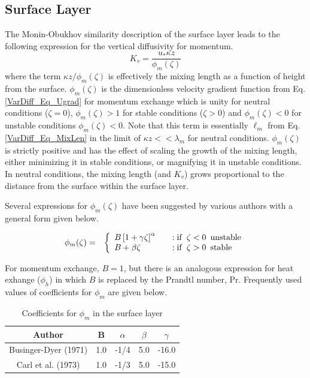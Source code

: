 \subsection{Surface Layer}

The Monin-Obukhov similarity description of the surface layer leads to the following
expression for the vertical diffusivity for momentum.
\begin{equation}\label{VarDiff_Eq_Kz_Surf}
K_v = \frac{u_{*} \kappa z}{\phi_m(\zeta)}
\end{equation}
where the term $\kappa z / \phi_m(\zeta)$ is effectively the mixing length as a function of height from the
surface.
$\phi_m(\zeta)$ is the dimensionless velocity gradient 
function from Eq. \ref{VarDiff_Eq_Ugrad} for momentum exchange which is unity for neutral conditions ($\zeta=0$),
$\phi_m(\zeta)>1$ for stable conditions ($\zeta>0$) and $\phi_m(\zeta)<0$ for unstable
conditions $\phi_m(\zeta)<0$.
Note that this term is essentially $\ell_m$ from Eq. \ref{VarDiff_Eq_MixLen} in the limit of
$\kappa z << \lambda_m$ for neutral conditions. $\phi_m(\zeta)$ is strictly positive and
has the effect of scaling the growth of the mixing length, either minimizing it in
stable conditions, or magnifying it in unstable conditions. In neutral conditions, the
mixing length (and $K_v$) grows proportional to the distance from the surface within the
surface layer. 

Several expressions for $\phi_m(\zeta)$ have been suggested by various authors with a
general form given below.

\begin{eqnarray}\label{VarDiff_Eq_PhiB}
\phi_m(\zeta) &=& \left\{ \begin{array} {l@{\quad \quad}l}
B \left[ 1+\gamma \zeta\right]^{\alpha}  &:  \mathrm{if}\,\,\, \zeta < 0 \,\,\, \mathrm{unstable} \\
B  + \beta \zeta                         &:  \mathrm{if}\,\,\, \zeta > 0 \,\,\, \mathrm{stable}
\end{array}
\right.
\end{eqnarray}

For momentum exchange, $B=1$, but there is an analogous expression for heat exhange ($\phi_h$)
in which $B$ is replaced by the Prandtl number, $\mathrm{Pr}$.
Frequently used values of coefficients for $\phi_m$ are given below.
\small
\begin{table}[htbp]
\begin{center}
\begin{tabular}{| c | c | c | c | c |}
\hline
Author & B & $\alpha$ & $\beta$ & $\gamma$\\
\hline
Businger-Dyer (1971) \cite{Businger1971} & 1.0  & -1/4 & 5.0 & -16.0 \\
Carl et al. (1973)   \cite{Carl1973}     & 1.0  & -1/3 & 5.0 & -15.0 \\
\hline
\end{tabular}
\caption{\label{Tab_VarDiff_phisurf}Coefficients for $\phi_m$ in the surface layer \cite[Chap. 6.5.1-2]{Panofsky1984}}
\end{center}
\end{table}
\normalsize

